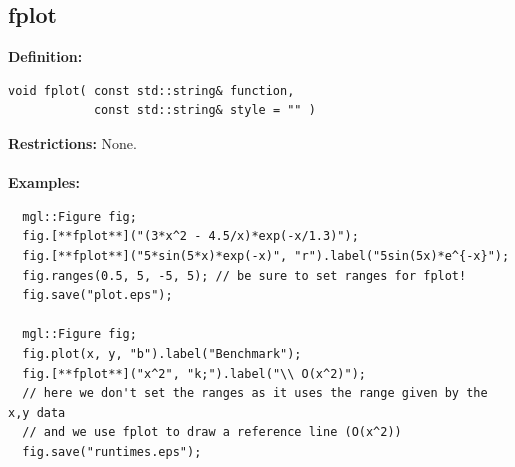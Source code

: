 \documentclass[a4paper]{article}
\newcommand{\command}[1]{\subsection{#1}}
\begin{document}
\newpage
\command{fplot}

\textbf{Definition:}
\begin{lstlisting}
void fplot( const std::string& function,
            const std::string& style = "" )
\end{lstlisting}
\textbf{Restrictions:} None. \\ \\
%
\textbf{Examples:}
\begin{lstlisting}
  mgl::Figure fig;
  fig.[**fplot**]("(3*x^2 - 4.5/x)*exp(-x/1.3)");
  fig.[**fplot**]("5*sin(5*x)*exp(-x)", "r").label("5sin(5x)*e^{-x}");
  fig.ranges(0.5, 5, -5, 5); // be sure to set ranges for fplot!
  fig.save("plot.eps");

  mgl::Figure fig;
  fig.plot(x, y, "b").label("Benchmark");
  fig.[**fplot**]("x^2", "k;").label("\\ O(x^2)");
  // here we don't set the ranges as it uses the range given by the x,y data
  // and we use fplot to draw a reference line (O(x^2))
  fig.save("runtimes.eps"); 
\end{lstlisting}
\end{document}
